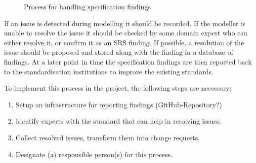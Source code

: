 \begin{figure}
\begin{center}
\sf\footnotesize
{}
\end{center}
\caption{Process for handling specification findings}
\label{fig:srs_findings_process}
\end{figure}

If an issue is detected during modelling it should be recorded. If the modeller is unable to resolve the issue it should be checked by some domain expert who can either resolve it, or confirm it as an SRS finding. If possible, a resolution of the issue should be proposed and stored along with the finding in a database of findings. At a later point in time the specification findings are then reported back to the standardisation institutions to improve the existing standards.

To implement this process in the project, the following steps are necessary:
\begin{enumerate}
  \item Setup an infrastructure for reporting findings (GitHub-Repository?)
  \item Identify experts with the standard that can help in resolving issues.
  \item Collect resolved issues, transform them into change requests.
  \item Designate (a) responsible person(s) for this process.
\end{enumerate}
